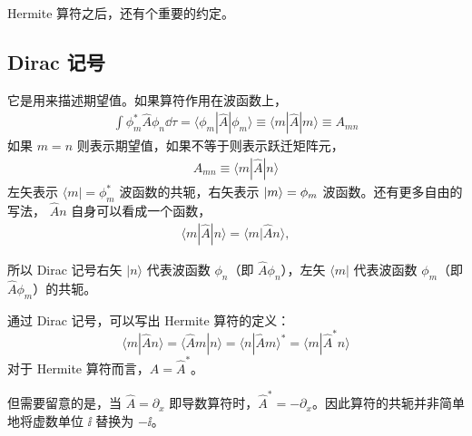 Hermite 算符之后，还有个重要的约定。

\subsection{Dirac 记号}

它是用来描述期望值。如果算符作用在波函数上，
\begin{eqnarray}
    \int \phi_m^* \hat A \phi_n \dd\tau = \langle \phi_m | \hat A | \phi_m \rangle \equiv \langle m | \hat A | m \rangle \equiv A_{mn}
\end{eqnarray}
如果 $m = n$ 则表示期望值，如果不等于则表示跃迁矩阵元，
\begin{eqnarray}
    A_{mn} \equiv \langle m | \hat A | n \rangle
\end{eqnarray}
左矢表示 $\langle m| = \phi_m^*$ 波函数的共轭，右矢表示 $\ket{m} = \phi_m$ 波函数。还有更多自由的写法，
$\hat A n$ 自身可以看成一个函数，
\begin{eqnarray}
    \langle m | \hat A | n \rangle = \langle m | \hat A n \rangle,
\end{eqnarray}

所以 Dirac 记号右矢 $|n\rangle$ 代表波函数 $\phi_n$（即 $\hat A \phi_n$），左矢 $\langle m |$ 代表波函数 $\phi_m$（即 $\hat A \phi_m$）的共轭。


通过 Dirac 记号，可以写出 Hermite 算符的定义：
\begin{equation}
  \langle m | \hat A n \rangle = \langle \hat A m | n \rangle = \langle n | \hat A m \rangle^* = \langle m | \hat A^* n \rangle
\end{equation}
对于 Hermite 算符而言，$\hat A = \hat A^*$。

但需要留意的是，当 $\hat A = \partial_x$ 即导数算符时，$\hat A^* = - \partial_x$。因此算符的共轭并非简单地将虚数单位 $\ii$ 替换为 $-\ii$。



